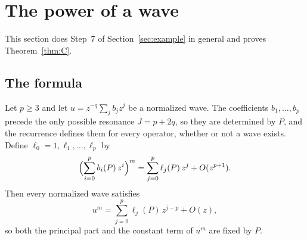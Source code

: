 \documentclass[11pt]{article}
\theoremstyle{definition}
\theoremstyle{remark}
\numberwithin{equation}{section}
\begin{document}
\section{The power of a wave}\label{sec:power}

This section does Step~7 of Section~\ref{sec:example} in general and
proves Theorem~\ref{thm:C}.

\subsection{The formula}\label{sec:power-formula}

Let \(p\ge3\) and let \(u=z^{-q}\sum_jb_jz^j\) be a normalized wave. The coefficients \(b_1,\dots,b_p\) precede the only
possible resonance \(J=p+2q\), so they are determined by \(P\), and the
recurrence defines them for every operator, whether or not a wave
exists. Define \(\ell_0=1,\ell_1,\dots,\ell_p\) by
\begin{equation}\label{eq:ell}
 \Bigl(\sum_{i=0}^{p}b_i(P)\,z^i\Bigr)^{m}
 =\sum_{j=0}^{p}\ell_j(P)\,z^j+O(z^{p+1}).
\end{equation}
Then every normalized wave satisfies
\[
 u^m=\sum_{j=0}^{p}\ell_j(P)\,z^{j-p}+O(z),
\]
so both the principal part and the constant term of \(u^m\) are fixed
by \(P\).
\end{document}
